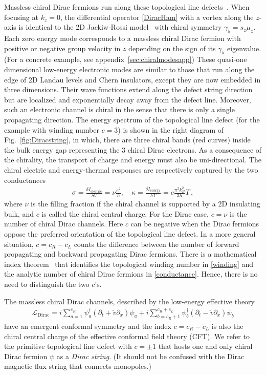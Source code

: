 Massless chiral Dirac fermions run along these topological line defects~\cite{TeoKane}. When focusing at $k_z=0$, the differential operator \eqref{DiracHam} with a vortex along the $z$-axis is identical to the 2D Jackiw-Rossi model~\cite{JackiwRossi81} with chiral symmetry $\gamma_5=s_z\mu_z$. Each zero energy mode corresponds to a massless chiral Dirac fermion with positive or negative group velocity in $z$ depending on the sign of its $\gamma_5$ eigenvalue. (For a concrete example, see appendix~\ref{sec:chiralmodesapp}) These quasi-one dimensional low-energy electronic modes are similar to those that run along the edge of 2D Landau levels and Chern insulators, except they are now embedded in three dimensions. Their wave functions extend along the defect string direction but are localized and exponentially decay away from the defect line. Moreover, such an electronic channel is chiral in the sense that there is only a single propagating direction. The energy spectrum of the topological line defect (for the example with winding number $c=3$) is shown in the right diagram of Fig.~\ref{fig:Diracstring}, in which, there are three chiral bands (red curves) inside the bulk energy gap representing the 3 chiral Dirac electrons. As a consequence of the chirality, the transport of charge and energy must also be uni-directional. The chiral electric and energy-thermal responses are respectively captured by the two conductances \begin{align}\sigma=\frac{\delta I_{\mathrm{electric}}}{\delta V}=\nu\frac{e^2}{h},\quad\kappa=\frac{\delta I_{\mathrm{energy}}}{\delta T}=c\frac{\pi^2k_B^2}{3h}T \,, \label{conductance}\end{align} where $\nu$ is the filling fraction if the chiral channel is supported by a 2D insulating bulk, and $c$ is called the chiral central charge. For the Dirac case, $c=\nu$ is the number of chiral Dirac channels. Here $c$ can be negative when the Dirac fermions oppose the preferred orientation of the topological line defect. In a more general situation, $c=c_R-c_L$ counts the difference between the number of forward propagating and backward propagating Dirac fermions. There is a mathematical index theorem~\cite{TeoKane,AtiyahSinger63,Nakaharabook} that identifies the topological winding number in \eqref{winding} and the analytic number of chiral Dirac fermions in \eqref{conductance}. Hence, there is no need to distinguish the two $c$'s. 

The massless chiral Dirac channels, described by the low-energy effective theory \begin{align}\mathcal{L}_{\mathrm{Dirac}}=i\sum_{a=1}^{c_R}\psi^\dagger_a(\partial_t+\tilde{v}\partial_x)\psi_a+i\sum_{b=c_R+1}^{c_R+c_L}\psi^\dagger_b(\partial_t-\tilde{v}\partial_x)\psi_b\label{lowenergy}\end{align} have an emergent conformal symmetry and the index $c=c_R-c_L$ is also the chiral central charge of the effective conformal field theory (\hypertarget{CFT}{CFT}). We refer to the primitive topological line defect with $c=\pm1$ that hosts one and only chiral Dirac fermion $\psi$ as a {\em Dirac string}. (It should not be confused with the Dirac magnetic flux string that connects monopoles.)

